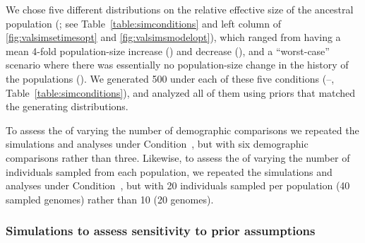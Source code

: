 We chose five different distributions on the
relative effective size of the ancestral population
(\rootrelativepopsize;
see Table~\ref{table:simconditions} and left column of
\figs \ref{fig:valsimsetimesopt} and \ref{fig:valsimsmodelopt}),
which ranged from having a mean 4-fold population-size increase (\vsimfourinc)
and decrease (\vsimfourdec),
and a ``worst-case'' scenario
where there was essentially no population-size change in the
history of the populations (\vsimnochange).
We generated 500 \datasets under each of these five conditions
(--, Table~\ref{table:simconditions}),
and analyzed all of them using priors that matched the generating
distributions.

To assess the  of varying the number of demographic
comparisons we repeated the simulations and analyses under
Condition~\vsimfourinc, but with six demographic comparisons rather than three.
Likewise, to assess the  of varying the number of
individuals sampled from each population, we repeated the simulations and
analyses under Condition~\vsimfourinc, but with 20 individuals sampled per
population (40 sampled genomes) rather than 10 (20 genomes).


\subsubsection{Simulations to assess sensitivity to prior assumptions}


